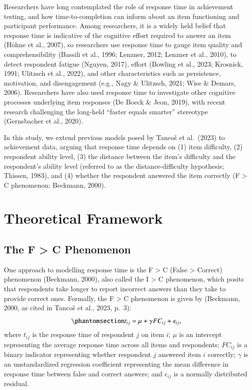 \documentclass[
  number]{elsarticle}
\begin{document}
Researchers have long contemplated the role of response time in
achievement testing, and how time-to-completion can inform about an item
functioning and participant performance. Among researchers, it is a
widely held belief that response time is indicative of the cognitive
effort required to answer an item (Höhne et al., 2007), so researchers
use response time to gauge item quality and comprehensibility (Bassili
et al., 1996; Lenzner, 2012; Lenzner et al., 2010), to detect respondent
fatigue (Nguyen, 2017), effort (Bowling et al., 2023; Krosnick, 1991;
Ulitzsch et al., 2022), and other characteristics such as persistence,
motivation, and disengagement (e.g., Nagy \& Ulitzsch, 2021; Wise \&
Demars, 2006). Researchers have also used response time to investigate
other cognitive processes underlying item responses (De Boeck \& Jeon,
2019), with recent research challenging the long-held ``faster equals
smarter'' stereotype (Gernsbacher et al., 2020).

In this study, we extend previous models posed by Tancoš et al.~(2023)
to achievement data, arguing that response time depends on (1) item
difficulty, (2) respondent ability level, (3) the distance between the
item's difficulty and the respondent's ability level (referred to as the
distance-difficulty hypothesis; Thissen, 1983), and (4) whether the
respondent answered the item correctly (F \textgreater{} C phenomenon;
Beckmann, 2000).

\section{Theoretical Framework}\label{theoretical-framework}

\subsection{The F \textgreater{} C Phenomenon}\label{the-f-c-phenomenon}

One approach to modelling response time is the F \textgreater{} C (False
\textgreater{} Correct) phenomenon (Beckmann, 2000), also called the I
\textgreater{} C phenomenon, which posits that respondents take longer
to report incorrect answers than they take to provide correct ones.
Formally, the F \textgreater{} C phenomenon is given by (Beckmann, 2000,
as cited in Tancoš et al., 2023, p.~3):
\begin{equation}\phantomsection\label{eq-FC}{t_{ij} = \mu + \gamma FC_{ij} + \epsilon_{ij},}\end{equation}
where \(t_{ij}\) is the response time of respondent \(j\) on item \(i\);
\(\mu\) is an intercept representing the average response time across
all items and respondents; \(FC_{ij}\) is a binary indicator
representing whether respondent \(j\) answered item \(i\) correctly;
\(\gamma\) is an unstandardized regression coefficient representing the
mean difference in response time between false and correct answers; and
\(\epsilon_{ij}\) is a normally distributed residual.
\end{document}
